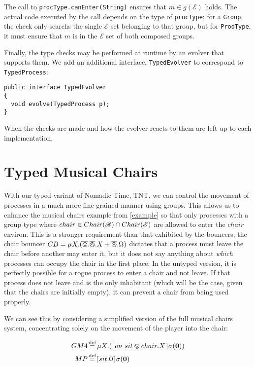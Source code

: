 \noindent The call to \texttt{procType.canEnter(String)} ensures that
$m \in g(\mathscr{E})$ holds.  The actual code executed by the call
depends on the type of \texttt{procType}; for a \texttt{Group}, the
check only searchs the single $\mathcal{E}$ set belonging to that
group, but for \texttt{ProdType}, it must ensure that $m$ is in the
$\mathcal{E}$ set of both composed groups.

Finally, the type checks may be performed at runtime by an evolver
that supports them.  We add an additional interface,
\texttt{TypedEvolver} to correspond to \texttt{TypedProcess}:

\begin{verbatim}
public interface TypedEvolver
{
  void evolve(TypedProcess p);
}
\end{verbatim}

\noindent When the checks are made and how the evolver reacts to them
are left up to each implementation.

\section{Typed Musical Chairs}

With our typed variant of Nomadic Time, TNT, we can control the
movement of processes in a much more fine grained manner using groups.
This allows us to enhance the musical chairs example from
\ref{example} so that only processes with a group type where $chair
\in Chair(\mathscr{R}) \cap Chair(\mathscr{E})$ are allowed to enter the
$chair$ environ.  This is a stronger requirement than that exhibited
by the bouncers; the chair bouncer $CB = \mu X.(\overline{\varovee} .\overline{\varowedge} .X +
\overline{\varoast} .\Omega)$ dictates that a process must leave the chair before
another may enter it, but it does not say anything about \emph{which}
processes can occupy the chair in the first place.  In the untyped
version, it is perfectly possible for a rogue process to enter a chair
and not leave.  If that process does not leave and is the only
inhabitant (which will be the case, given that the chairs are
initially empty), it can prevent a chair from being used properly.

We can see this by considering a simplified version of the full
musical chairs system, concentrating solely on the movement of the
player into the chair:

\begin{equation}
\begin{aligned}
GM4 & \operatorname{\stackrel{\textrm{def}}{=}} \mu X.(\lceil{on\ sit \varovee chair.X}\rceil {\sigma} ({\textbf{0}})) \\
MP & \operatorname{\stackrel{\textrm{def}}{=}} \lceil{sit.\textbf{0}}\rceil {\sigma} ({\textbf{0}})
\end{aligned}
\end{equation}

